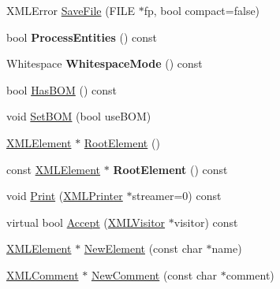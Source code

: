 \begin{DoxyCompactItemize}
\item 
X\+M\+L\+Error \mbox{\hyperlink{classtinyxml2_1_1_x_m_l_document_a8b95779479a0035acc67b3a61dfe1b74}{Save\+File}} (F\+I\+LE $\ast$fp, bool compact=false)
\item 
\mbox{\label{classtinyxml2_1_1_x_m_l_document_a53e6c035b1b539563fef8c817fb30469}} 
bool {\bfseries Process\+Entities} () const
\item 
\mbox{\label{classtinyxml2_1_1_x_m_l_document_a810ce508e6e0365497c2a9deb83c9ca7}} 
Whitespace {\bfseries Whitespace\+Mode} () const
\item 
bool \mbox{\hyperlink{classtinyxml2_1_1_x_m_l_document_a33fc5d159db873a179fa26338adb05bd}{Has\+B\+OM}} () const
\item 
void \mbox{\hyperlink{classtinyxml2_1_1_x_m_l_document_a14419b698f7c4b140df4e80f3f0c93b0}{Set\+B\+OM}} (bool use\+B\+OM)
\item 
\mbox{\hyperlink{classtinyxml2_1_1_x_m_l_element}{X\+M\+L\+Element}} $\ast$ \mbox{\hyperlink{classtinyxml2_1_1_x_m_l_document_ad2b70320d3c2a071c2f36928edff3e1c}{Root\+Element}} ()
\item 
\mbox{\label{classtinyxml2_1_1_x_m_l_document_a2be8ef9d6346bdef34311f91529afae4}} 
const \mbox{\hyperlink{classtinyxml2_1_1_x_m_l_element}{X\+M\+L\+Element}} $\ast$ {\bfseries Root\+Element} () const
\item 
void \mbox{\hyperlink{classtinyxml2_1_1_x_m_l_document_a867cf5fa3e3ff6ae4847a8b7ee8ec083}{Print}} (\mbox{\hyperlink{classtinyxml2_1_1_x_m_l_printer}{X\+M\+L\+Printer}} $\ast$streamer=0) const
\item 
virtual bool \mbox{\hyperlink{classtinyxml2_1_1_x_m_l_document_ab7be651917a35ab1ff0e4e6d4e565cdf}{Accept}} (\mbox{\hyperlink{classtinyxml2_1_1_x_m_l_visitor}{X\+M\+L\+Visitor}} $\ast$visitor) const
\item 
\mbox{\hyperlink{classtinyxml2_1_1_x_m_l_element}{X\+M\+L\+Element}} $\ast$ \mbox{\hyperlink{classtinyxml2_1_1_x_m_l_document_a3c335a700a43d7c363a393142a23f234}{New\+Element}} (const char $\ast$name)
\item 
\mbox{\hyperlink{classtinyxml2_1_1_x_m_l_comment}{X\+M\+L\+Comment}} $\ast$ \mbox{\hyperlink{classtinyxml2_1_1_x_m_l_document_a386df0befd06aadb5e0cd21381aa955a}{New\+Comment}} (const char $\ast$comment)
\item 

\end{DoxyCompactItemize}
